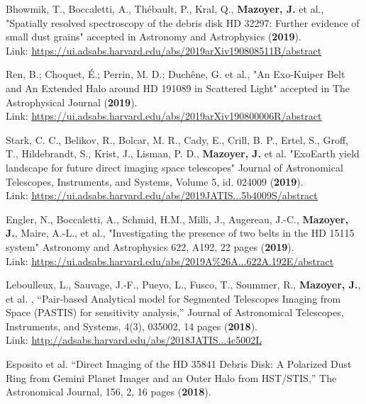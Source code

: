 \documentclass[12pt]{article}
\begin{document}
\begin{etaremune}
\item Bhowmik, T., Boccaletti, A., Thébault, P., Kral, Q., \textbf{Mazoyer, J.} et al.,
"Spatially resolved spectroscopy of the debris disk HD 32297: Further evidence of small dust grains"
accepted in Astronomy and Astrophysics (\textbf{2019}).\\
Link: \textcolor{BrickRed}{\underline{\url{https://ui.adsabs.harvard.edu/abs/2019arXiv190808511B/abstract}}}
\item Ren, B.; Choquet, É.; Perrin, M. D.; Duchêne, G. et al., "An Exo-Kuiper Belt and An Extended Halo around HD 191089 in Scattered Light"
accepted in The Astrophysical Journal (\textbf{2019}).\\
Link: \textcolor{BrickRed}{\underline{\url{https://ui.adsabs.harvard.edu/abs/2019arXiv190800006R/abstract}}}
\item Stark, C. C., Belikov, R., Bolcar, M. R., Cady, E., Crill, B. P., Ertel, S., Groff, T., Hildebrandt, S., Krist, J., Lisman, P. D., \textbf{Mazoyer, J.} et al.
"ExoEarth yield landscape for future direct imaging space telescopes"
Journal of Astronomical Telescopes, Instruments, and Systems, Volume 5, id. 024009 (\textbf{2019}).\\
Link: \textcolor{BrickRed}{\underline{\url{https://ui.adsabs.harvard.edu/abs/2019JATIS...5b4009S/abstract}}}
\item Engler, N., Boccaletti, A., Schmid, H.M., Milli, J., Augereau, J.-C., \textbf{Mazoyer, J.}, Maire, A.-L., et al., "Investigating the presence of two belts in the HD 15115 system"
Astronomy and Astrophysics 622, A192, 22 pages (\textbf{2019}).\\
Link: \textcolor{BrickRed}{\underline{\url{https://ui.adsabs.harvard.edu/abs/2019A\%26A...622A.192E/abstract}}}
\item Leboulleux, L., Sauvage, J.-F., Pueyo, L.,  Fusco, T., Soummer, R., \textbf{Mazoyer, J.}, et al. , “Pair-based Analytical model for Segmented Telescopes Imaging from Space (PASTIS) for sensitivity analysis,” Journal of Astronomical Telescopes, Instruments, and Systems, 4(3), 035002, 14 pages  (\textbf{2018}).\\
Link: \textcolor{BrickRed}{\underline{\url{http://adsabs.harvard.edu/abs/2018JATIS...4c5002L}}}
\item Esposito et al. “Direct Imaging of the HD 35841 Debris Disk: A Polarized Dust Ring from Gemini Planet Imager and an Outer Halo from HST/STIS,” The Astronomical Journal, 156, 2, 16 pages (\textbf{2018}).\\

\end{etaremune}
\end{document}
